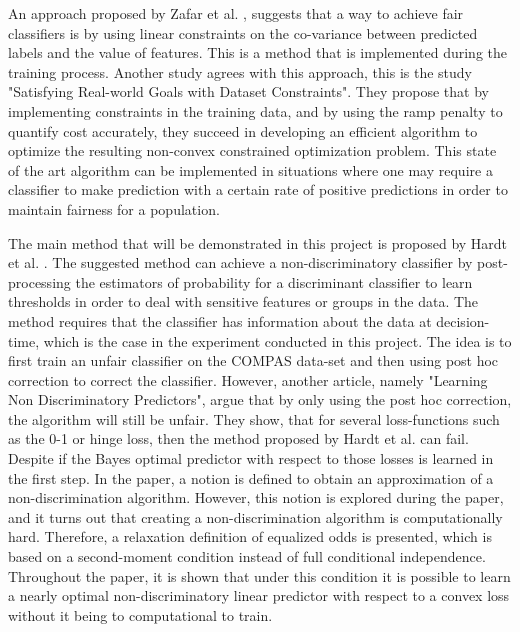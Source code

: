 \documentclass[11pt, fleqn, titlepage]{article}
\begin{document}
	An approach proposed by Zafar et al. \cite{Zafar}, suggests that a way to achieve fair classifiers is by using linear constraints on the co-variance between predicted labels and the value of features. This is a method that is implemented during the training process. Another study agrees with this approach, this is the study "Satisfying Real-world Goals with Dataset Constraints". They propose that by implementing constraints in the training data, and by using the ramp penalty to quantify cost accurately, they succeed in developing an efficient algorithm to optimize the resulting non-convex constrained optimization problem. This state of the art algorithm can be implemented in situations where one may require a classifier to make prediction with a certain rate of positive predictions in order to maintain fairness for a population. \cite{g_goh}
	

	
	The main method that will be demonstrated in this project is proposed by Hardt et al. \cite{equal_of_oppor}. The suggested method can achieve a non-discriminatory classifier by post-processing the estimators of probability for a discriminant classifier to learn thresholds in order to deal with sensitive features or groups in the data. The method requires that the classifier has information about the data at decision-time, which is the case in the experiment conducted in this project. The idea is to first train an unfair classifier on the COMPAS data-set and then using post hoc correction to correct the classifier. However, another article, namely "Learning Non Discriminatory Predictors", argue that by only using the post hoc correction, the algorithm will still be unfair. They show, that for several loss-functions such as the 0-1 or hinge loss, then the method proposed by Hardt et al. \cite{equal_of_oppor} can fail. Despite if the Bayes optimal predictor with respect to those losses is learned	in the first step. In the paper, a notion is defined to obtain an approximation of a non-discrimination algorithm. However, this notion is explored during the paper, and it turns out that creating a non-discrimination algorithm is computationally hard. Therefore, a relaxation definition of equalized odds is presented, which is based on a second-moment condition instead of full conditional independence. Throughout the paper, it is shown that under this condition it is possible to learn a nearly optimal non-discriminatory linear predictor with respect to a convex loss without it being to computational to train. \cite{b_woodworth}
	
\end{document}
